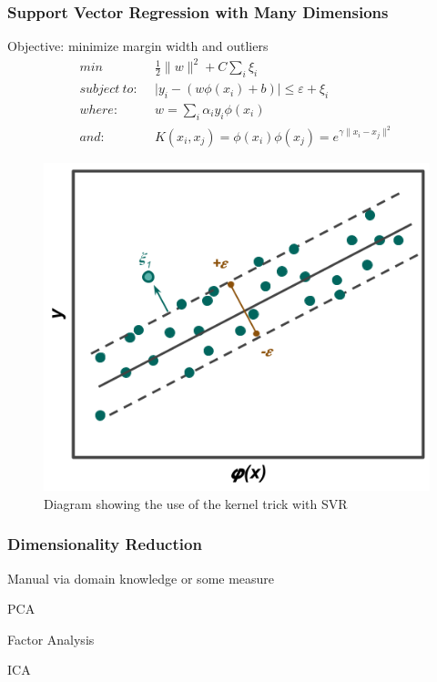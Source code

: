\begin{frame}
  \frametitle{Support Vector Regression with Many Dimensions}
  \begin{minipage}{.5\textwidth}
    Objective: minimize margin width and outliers
    \scriptsize
    \begin{equation*}
      \begin{split}
        min\ & \frac{1}{2} \lVert w \rVert ^{2} + C \sum_{i} \xi_{i} \\
        subject\ to:\ \ & \lvert y_i - (w \phi(x_i) + b) \rvert \leq \varepsilon + \xi_i \\
        where:\ & w = \sum_{i} \alpha_i y_i \phi(x_i) \\
        and:\ & K(x_i, x_j) = \phi(x_i) \phi(x_j) = e^{\gamma \lVert x_i - x_j \rVert ^{2}}
      \end{split}
    \end{equation*} 
    \normalsize
  \end{minipage}%
  \begin{minipage}{.5\textwidth}
    \centering
    \begin{figure}
      \centering
      \includegraphics[width=\linewidth]{./figures/svr-b.png}
      \caption{Diagram showing the use of the kernel trick with SVR}
    \end{figure}
  \end{minipage}
\end{frame}

\begin{frame}
  \frametitle{Dimensionality Reduction}
  Manual via domain knowledge or some measure
  
  PCA

  Factor Analysis

  ICA
\end{frame}
